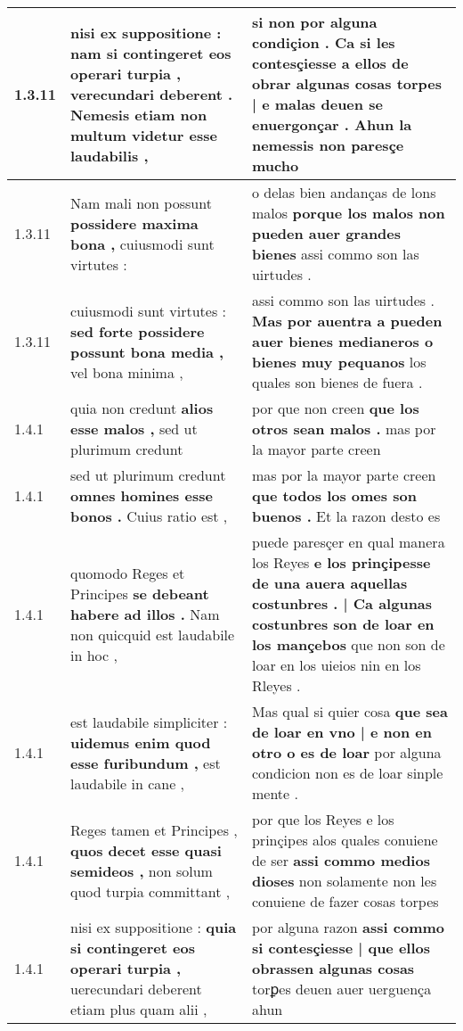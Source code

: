 \begin{tabular}{|p{1cm}|p{6.5cm}|p{6.5cm}|}
1.3.11 & nisi ex suppositione : \textbf{ nam si contingeret eos operari turpia , } verecundari deberent . Nemesis etiam non multum videtur esse laudabilis , & si non por alguna condiçion . \textbf{ Ca si les contesçiesse a ellos de obrar algunas cosas torpes | e malas deuen se enuergonçar . } Ahun la nemessis non paresçe mucho \\\hline
1.3.11 & Nam mali non possunt \textbf{ possidere maxima bona , } cuiusmodi sunt virtutes : & o delas bien andanças de lons malos \textbf{ porque los malos non pueden auer grandes bienes } assi commo son las uirtudes . \\\hline
1.3.11 & cuiusmodi sunt virtutes : \textbf{ sed forte possidere possunt bona media , } vel bona minima , & assi commo son las uirtudes . \textbf{ Mas por auentra a pueden auer bienes medianeros o bienes muy pequanos } los quales son bienes de fuera . \\\hline
1.4.1 & quia non credunt \textbf{ alios esse malos , } sed ut plurimum credunt & por que non creen \textbf{ que los otros sean malos . } mas por la mayor parte creen \\\hline
1.4.1 & sed ut plurimum credunt \textbf{ omnes homines esse bonos . } Cuius ratio est , & mas por la mayor parte creen \textbf{ que todos los omes son buenos . } Et la razon desto es \\\hline
1.4.1 & quomodo Reges et Principes \textbf{ se debeant habere ad illos . } Nam non quicquid est laudabile in hoc , & puede paresçer en qual manera los Reyes \textbf{ e los prinçipesse de una auera aquellas costunbres . | Ca algunas costunbres son de loar en los mançebos } que non son de loar en los uieios nin en los Rleyes . \\\hline
1.4.1 & est laudabile simpliciter : \textbf{ uidemus enim quod esse furibundum , } est laudabile in cane , & Mas qual si quier cosa \textbf{ que sea de loar en vno | e non en otro o es de loar } por alguna condicion non es de loar sinple mente . \\\hline
1.4.1 & Reges tamen et Principes , \textbf{ quos decet esse quasi semideos , } non solum quod turpia committant , & por que los Reyes e los prinçipes alos quales conuiene de ser \textbf{ assi commo medios dioses } non solamente non les conuiene de fazer cosas torpes \\\hline
1.4.1 & nisi ex suppositione : \textbf{ quia si contingeret eos operari turpia , } uerecundari deberent etiam plus quam alii , & por alguna razon \textbf{ assi commo si contesçiesse | que ellos obrassen algunas cosas } torꝑes deuen auer uerguença ahun \\\hline

\end{tabular}
